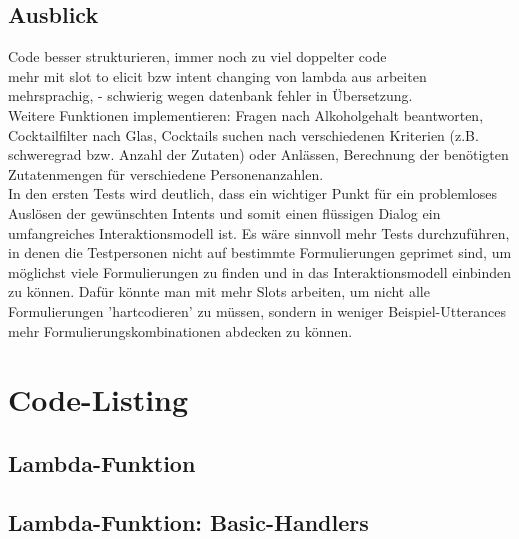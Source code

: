 \documentclass[12pt,letterpaper]{article}
\begin{document}
\subsection{Ausblick}
Code besser strukturieren, immer noch zu viel doppelter code\\
mehr mit slot to elicit bzw intent changing von lambda aus arbeiten\\
mehrsprachig, - schwierig wegen datenbank fehler in Übersetzung.\\
Weitere Funktionen implementieren: Fragen nach Alkoholgehalt beantworten, Cocktailfilter nach Glas, Cocktails suchen nach verschiedenen Kriterien (z.B. schweregrad bzw. Anzahl der Zutaten) oder Anlässen, Berechnung der benötigten Zutatenmengen für verschiedene Personenanzahlen. \\
In den ersten Tests wird deutlich, dass ein wichtiger Punkt für ein problemloses Auslösen der gewünschten Intents und somit einen flüssigen Dialog ein umfangreiches Interaktionsmodell ist. Es wäre sinnvoll mehr Tests durchzuführen, in denen die Testpersonen nicht auf bestimmte Formulierungen geprimet sind, um möglichst viele Formulierungen zu finden und in das Interaktionsmodell einbinden zu können. Dafür könnte man mit mehr Slots arbeiten, um nicht alle Formulierungen 'hartcodieren' zu müssen, sondern in weniger Beispiel-Utterances mehr Formulierungskombinationen abdecken zu können.
\section{Code-Listing}
\subsection{Lambda-Funktion}

\subsection{Lambda-Funktion: Basic-Handlers}

\end{document}
